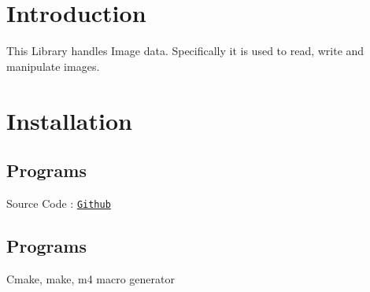 \hypertarget{index_intro_sec}{}\section{Introduction}\label{index_intro_sec}
This Library handles Image data. Specifically it is used to read, write and manipulate images.\hypertarget{index_install_sec}{}\section{Installation}\label{index_install_sec}
\hypertarget{index_Required}{}\subsection{Programs}\label{index_Required}
Source Code \+: \href{www.github.com}{\tt Github} \hypertarget{index_Required}{}\subsection{Programs}\label{index_Required}
Cmake, make, m4 macro generator 